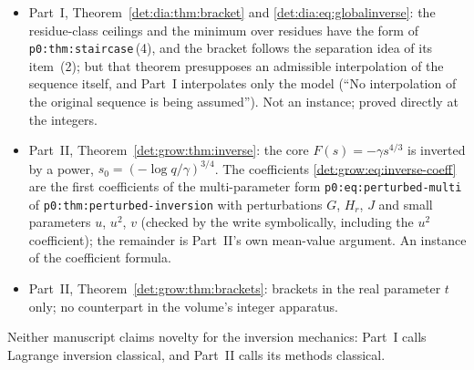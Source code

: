 \documentclass[11pt,letterpaper]{article}
\numberwithin{equation}{section}
\theoremstyle{definition}\newtheorem{definition}[theorem]{Definition}
\theoremstyle{remark}\newtheorem{remark}[theorem]{Remark}
\newcommand{\file}[1]{\nolinkurl{#1}}
\begin{document}
\begin{itemize}
\item Part~I, Theorem~\ref{det:dia:thm:bracket} and \eqref{det:dia:eq:globalinverse}: the residue-class ceilings and the minimum over residues have the form of \file{p0:thm:staircase}\,(4), and the bracket follows the separation idea of its item~(2); but that theorem presupposes an admissible interpolation of the sequence itself, and Part~I interpolates only the model (``No interpolation of the original sequence is being assumed''). Not an instance; proved directly at the integers.
\item Part~II, Theorem~\ref{det:grow:thm:inverse}: the core $F(s)=-\gamma s^{4/3}$ is inverted by a power, $s_0=(-\log q/\gamma)^{3/4}$. The coefficients \eqref{det:grow:eq:inverse-coeff} are the first coefficients of the multi-parameter form \file{p0:eq:perturbed-multi} of \file{p0:thm:perturbed-inversion} with perturbations $G$, $H_r$, $J$ and small parameters $u$, $u^2$, $v$ (checked by the write symbolically, including the $u^2$ coefficient); the remainder is Part~II's own mean-value argument. An instance of the coefficient formula.
\item Part~II, Theorem~\ref{det:grow:thm:brackets}: brackets in the real parameter $t$ only; no counterpart in the volume's integer apparatus.
\end{itemize}
Neither manuscript claims novelty for the inversion mechanics: Part~I calls Lagrange inversion classical, and Part~II calls its methods classical.
\end{document}
